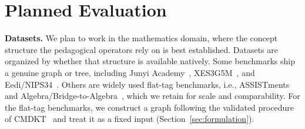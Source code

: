\documentclass[conference]{IEEEtran}
\begin{document}

\section{Planned Evaluation}
\label{sec:eval}

\textbf{Datasets.} We plan to work in the mathematics domain, where the concept structure the pedagogical operators rely on is best established. Datasets are organized by whether that structure is available natively. Some benchmarks ship a genuine graph or tree, including Junyi Academy~\cite{chang2015junyi}, XES3G5M~\cite{liu2023xes3g5m}, and Eedi/NIPS34~\cite{wang2021neurips}. Others are widely used flat-tag benchmarks, i.e., ASSISTments~\cite{feng2009assistments} and Algebra/Bridge-to-Algebra~\cite{stamper2010kddcup}, which we retain for scale and comparability. For the flat-tag benchmarks, we construct a graph following the validated procedure of CMDKT~\cite{xia2025cmdkt} and treat it as a fixed input (Section~\ref{sec:formulation}).
\end{document}
